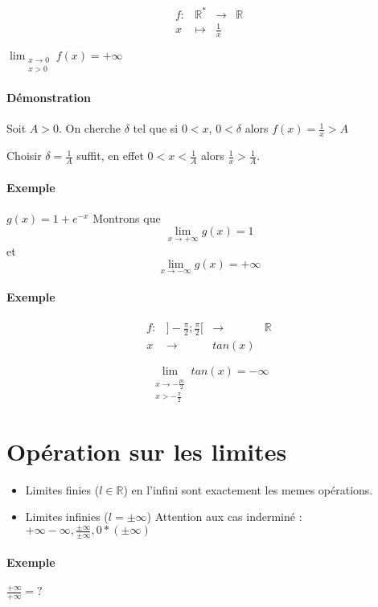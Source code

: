 \begin{align*}
	f:& \mathbb{R}^* &\rightarrow & \mathbb{R} \\
	x&\mapsto& \frac{1}{x}
\end{align*}

$\lim_{\substack{x \to 0 \\ x > 0}} f(x) = +\infty$
\paragraph{Démonstration} Soit $A>0$. On cherche $\delta$ tel que si $0<x$, $0<\delta$ alors $f(x) = \frac{1}{x} > A$

Choisir $\delta = \frac{1}{A}$ suffit, en effet $0<x<\frac{1}{A}$ alors $\frac{1}{x} > \frac{1}{A}$.

\paragraph{Exemple}
$g(x) = 1+e^{-x}$ Montrons que \[\lim_{x \to +\infty} g(x) = 1\] et \[\lim_{x \to -\infty}g(x) = +\infty\]

\paragraph{Exemple}
\begin{align*}
f:& ]-\frac{\pi}{2}; \frac{\pi}{2}[ &\rightarrow & \mathbb{R} \\
	x&\rightarrow& tan(x)
\end{align*}

\[\lim_{\substack{x \to -\frac{pi}{2} \\  x > - \frac{\pi}{2}}} tan(x) = -\infty\]

\section{Opération sur les limites}
\begin{itemize}
	\item[] Limites finies ($l\in \mathbb{R}$) en l'infini sont exactement les memes opérations.
	\item[] Limites infinies ($l = \pm \infty$) Attention aux cas inderminé :
		$+\infty - \infty, \frac{\pm \infty}{\pm\infty}, 0*(\pm\infty)$
\end{itemize}

\paragraph{Exemple} $\frac{+\infty}{+\infty} = ?$

